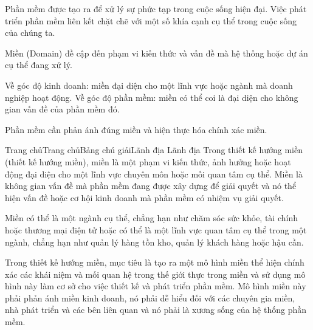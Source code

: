 Phần mềm được tạo ra để xử lý sự phức tạp trong cuộc sống hiện đại. Việc phát triển phần mềm liên kết chặt chẽ với một số khía cạnh cụ thể trong cuộc sống của chúng ta.

Miền (Domain) đề cập đến phạm vi kiến thức và vấn đề mà hệ thống hoặc dự án cụ thể đang xử lý.

Về góc độ kinh doanh: miền đại diện cho một lĩnh vực hoặc ngành mà doanh nghiệp hoạt động.
Về góc độ phần mềm: miền có thể coi là đại diện cho không gian vấn đề của phần mềm đó.

Phần mềm cần phản ánh đúng miền và hiện thực hóa chính xác miền.




Trang chủTrang chủBảng chú giảiLãnh địa
Lãnh địa
Trong thiết kế hướng miền (thiết kế hướng miền), miền là một phạm vi kiến thức, ảnh hưởng hoặc hoạt động đại diện cho một lĩnh vực chuyên môn hoặc mối quan tâm cụ thể. Miền là không gian vấn đề mà phần mềm đang được xây dựng để giải quyết và nó thể hiện vấn đề hoặc cơ hội kinh doanh mà phần mềm có nhiệm vụ giải quyết.

Miền có thể là một ngành cụ thể, chẳng hạn như chăm sóc sức khỏe, tài chính hoặc thương mại điện tử hoặc có thể là một lĩnh vực quan tâm cụ thể trong một ngành, chẳng hạn như quản lý hàng tồn kho, quản lý khách hàng hoặc hậu cần.

Trong thiết kế hướng miền, mục tiêu là tạo ra một mô hình miền thể hiện chính xác các khái niệm và mối quan hệ trong thế giới thực trong miền và sử dụng mô hình này làm cơ sở cho việc thiết kế và phát triển phần mềm. Mô hình miền này phải phản ánh miền kinh doanh, nó phải dễ hiểu đối với các chuyên gia miền, nhà phát triển và các bên liên quan và nó phải là xương sống của hệ thống phần mềm.

